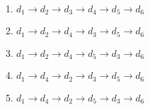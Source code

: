 \begin{enumerate}
	\centering
	\item $d_{1} \rightarrow d_{2} \rightarrow d_{3} \rightarrow d_{4} \rightarrow d_{5} \rightarrow d_{6}$
	\item $d_{1} \rightarrow d_{2} \rightarrow d_{4} \rightarrow d_{3} \rightarrow d_{5} \rightarrow d_{6}$
	\item $d_{1} \rightarrow d_{2} \rightarrow d_{4} \rightarrow d_{5} \rightarrow d_{3} \rightarrow d_{6}$
	\item $d_{1} \rightarrow d_{4} \rightarrow d_{2} \rightarrow d_{3} \rightarrow d_{5} \rightarrow d_{6}$
	\item $d_{1} \rightarrow d_{4} \rightarrow d_{2} \rightarrow d_{5} \rightarrow d_{3} \rightarrow d_{6}$
\end{enumerate}


